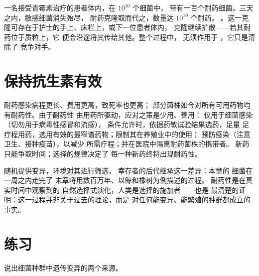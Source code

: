 \begin{example}[从一个细胞到一间病房]\label{ex:g11:antibiotic-resistance:ward}
一名接受青霉素治疗的患者体内，在 $10^{10}$ 个细菌中，
带有一百个耐药细菌。三天之内，敏感细菌消失殆尽，
耐药克隆取而代之，数量达 $10^{10}$ 个耐药。
。这一克隆可存在于护士的手上、床栏上，或下一位患者体内，
克隆继续扩散——若其耐药位于质粒上，它
便会沿途将其传给其他。整个过程中，
无须作用于 ，它只是清除了
竞争对手。
\end{example}

\section{保持抗生素有效}

\begin{proposition}[后果与应对]\label{prop:g11:antibiotic-resistance:consequences}
耐药感染病程更长、费用更高，致死率也更高；
部分菌株如今对所有可用药物均有耐药性。由于耐药性
由用药所驱动，应对之策是少用、善用：
仅用于细菌感染（切勿用于病毒性感冒和流感），
条件允许时，依据药敏试验结果选药，足量
足疗程用药，选用有效的最窄谱药物；限制其在养殖业中的使用；
预防感染（注意卫生、接种疫苗），以减少
所需疗程；并在医院中隔离耐药菌株的携带者。
新药只能争取时间；选择的规律决定了
每一种新药终将出现耐药性。
\end{proposition}
\admitted

\begin{remark}[一周之内的演化]\label{rem:g11:antibiotic-resistance:evolution}
随机提供变异，环境对其进行筛选，
幸存者的后代继承这一差异：本章的
细菌在一周之内走完了
末章将用数百万年、以鲸和橡树为例描述的过程。
耐药性是在真实时间中观察到的
自然选择式演化，人类是选择的施加者——也是
最清楚的证明：这一过程并非关于过去的理论，而是
对任何能变异、能繁殖的种群都成立的事实。
\end{remark}

\section{练习}

\begin{exercise}[$\star$]\label{exo:g11:antibiotic-resistance:1}
说出细菌种群中遗传变异的两个来源。
\end{exercise}

